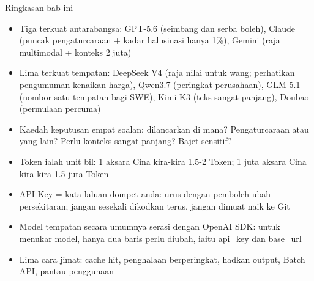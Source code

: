 \begin{tcbsummary}{Ringkasan bab ini}
\begin{itemize}
  \item Tiga terkuat antarabangsa: GPT-5.6 (seimbang dan serba boleh), Claude (puncak pengaturcaraan + kadar halusinasi hanya 1\%), Gemini (raja multimodal + konteks 2 juta)
  \item Lima terkuat tempatan: DeepSeek V4 (raja nilai untuk wang; perhatikan pengumuman kenaikan harga), Qwen3.7 (peringkat perusahaan), GLM-5.1 (nombor satu tempatan bagi SWE), Kimi K3 (teks sangat panjang), Doubao (permulaan percuma)
  \item Kaedah keputusan empat soalan: dilancarkan di mana? Pengaturcaraan atau yang lain? Perlu konteks sangat panjang? Bajet sensitif?
  \item Token ialah unit bil: 1 aksara Cina kira-kira 1.5-2 Token; 1 juta aksara Cina kira-kira 1.5 juta Token
  \item API Key = kata laluan dompet anda: urus dengan pemboleh ubah persekitaran; jangan sesekali dikodkan terus, jangan dimuat naik ke Git
  \item Model tempatan secara umumnya serasi dengan OpenAI SDK: untuk menukar model, hanya dua baris perlu diubah, iaitu api\_key dan base\_url
  \item Lima cara jimat: cache hit, penghalaan berperingkat, hadkan output, Batch API, pantau penggunaan
\end{itemize}

\end{tcbsummary}
